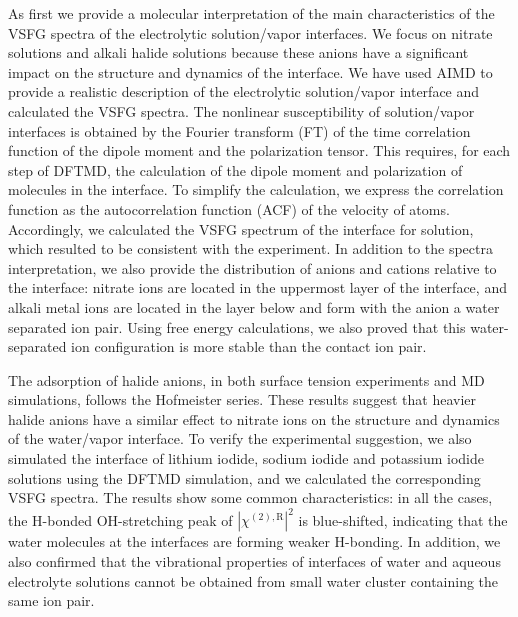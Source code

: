 As first we provide a molecular interpretation of the main characteristics of the
VSFG spectra of the electrolytic solution/vapor interfaces.
We focus on nitrate solutions and alkali halide solutions because these anions have a significant impact on the structure and dynamics of the interface.
We have used AIMD to provide a realistic description of the electrolytic solution/vapor interface and calculated the VSFG spectra.
The nonlinear susceptibility of solution/vapor interfaces is obtained by the Fourier transform (FT) of 
the time correlation function of the dipole moment and the polarization tensor. This requires, for each step of DFTMD, 
the calculation of the dipole moment and polarization of molecules in the interface. 
To simplify the calculation, we express the correlation function 
as the autocorrelation function (ACF) of the velocity of atoms. 
Accordingly, we calculated the VSFG spectrum of the interface for \LiN solution,
which resulted to be consistent with the experiment. 
In addition to the spectra interpretation, we also provide the distribution of anions 
and cations relative to the interface: nitrate ions are located in the uppermost layer of the interface, 
and alkali metal ions are located in the layer below and form with the anion a water separated ion pair. 
Using free energy calculations, we also proved that this water-separated ion configuration is more stable than the contact ion pair.

The adsorption of halide anions, in both surface tension experiments and MD simulations, 
follows the Hofmeister series.
These results suggest that heavier halide anions have a similar effect to nitrate ions on the structure and dynamics of the water/vapor interface. 
To verify the experimental suggestion, we also simulated the interface of lithium iodide, 
sodium iodide and potassium iodide solutions using the DFTMD simulation, and we calculated the corresponding VSFG spectra.
The results show some common characteristics: in all the cases, 
the H-bonded OH-stretching peak of $|\chi^{(2),\text{R}}|^2$ is blue-shifted, 
indicating that the water molecules at the interfaces are forming weaker H-bonding.
In addition, we also confirmed that the vibrational properties of interfaces of water and aqueous electrolyte solutions cannot be obtained from small water cluster containing the same ion pair.

